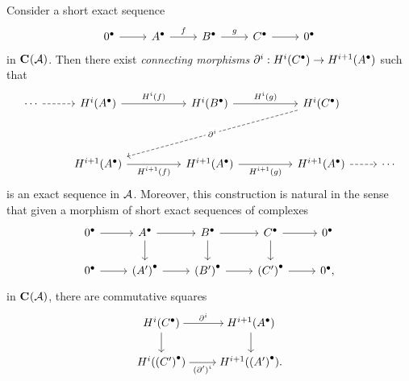 \begin{theorem}
  \label{thm_long_exact_cohomology_seq}
  Consider a short exact sequence
  \[
    \begin{tikzcd}
      \cochaincomp{0} \arrow[r]
      & \cochaincomp{A} \arrow[r, "f"]
      & \cochaincomp{B} \arrow[r, "g"]
      & \cochaincomp{C} \arrow[r]
      & \cochaincomp{0}
    \end{tikzcd}
  \]
  in ${\mathbf{C}}^{{}}({\mathcal{A}})$.
  Then there exist \emph{connecting morphisms} $\partial^i:
  H^i({{C}}^{\bullet}) \to H^{i + 1}({{A}}^{\bullet})$ such that
  \[
    \begin{tikzcd}
      \cdots & {H^i(\cochaincomp{A})} && {H^i(\cochaincomp{B})} &&
      {H^i(\cochaincomp{C})} \\
      \\
      & {H^{i + 1}(\cochaincomp{A})} && {H^{i + 1}(\cochaincomp{A})}
      && {H^{i + 1}(\cochaincomp{A})} & \cdots
      \arrow[dashed, from=1-1, to=1-2]
      \arrow["{H^i(f)}", from=1-2, to=1-4]
      \arrow["{H^i(g)}", from=1-4, to=1-6]
      \arrow["{\partial^i}"{description}, dashed, from=1-6, to=3-2]
      \arrow["{H^{i + 1}(f)}"', from=3-2, to=3-4]
      \arrow["{H^{i + 1}(g)}"', from=3-4, to=3-6]
      \arrow[dashed, from=3-6, to=3-7]
    \end{tikzcd}
  \]
  is an exact sequence in $\mathcal{A}$.
  Moreover, this construction is natural in the sense that given a
  morphism of short exact sequences of complexes
  \[
    \begin{tikzcd}
      \cochaincomp{0} & \cochaincomp{A} & \cochaincomp{B} &
      \cochaincomp{C} & \cochaincomp{0} \\
      \cochaincomp{0} & \cochaincomp{(A')} & \cochaincomp{(B')} &
      \cochaincomp{(C')} & \cochaincomp{0},
      \arrow[from=1-1, to=1-2]
      \arrow[from=1-2, to=1-3]
      \arrow[from=1-2, to=2-2]
      \arrow[from=1-3, to=1-4]
      \arrow[from=1-3, to=2-3]
      \arrow[from=1-4, to=1-5]
      \arrow[from=1-4, to=2-4]
      \arrow[from=2-1, to=2-2]
      \arrow[from=2-2, to=2-3]
      \arrow[from=2-3, to=2-4]
      \arrow[from=2-4, to=2-5]
    \end{tikzcd}
  \]
  in ${\mathbf{C}}^{{}}({\mathcal{A}})$, there are commutative squares
  \[
    \begin{tikzcd}[cramped]
      {H^i(\cochaincomp{C})} & {H^{i + 1}(\cochaincomp{A})} \\
      {H^i(\cochaincomp{(C')})} & {H^{i + 1}(\cochaincomp{(A')})}.
      \arrow["{\partial^i}", from=1-1, to=1-2]
      \arrow[from=1-1, to=2-1]
      \arrow[from=1-2, to=2-2]
      \arrow["{(\partial')^i}"', from=2-1, to=2-2]
    \end{tikzcd}
  \]
  \vspace{-18pt}
\end{theorem}


